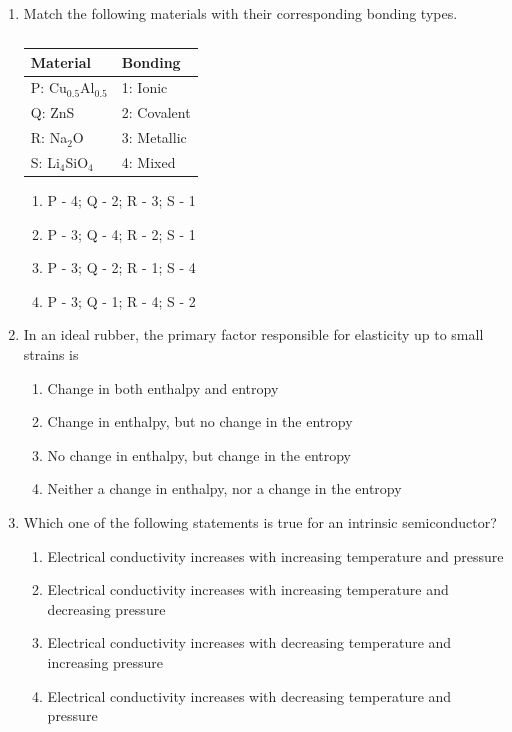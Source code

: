 \documentclass[a4paper,10pt]{article}
\begin{document}
\begin{enumerate}
\item Match the following materials with their corresponding bonding types.
\begin{table}[h]
    \centering
    \begin{tabular}{|l|l|}
    \hline
    \textbf{Material} & \textbf{Bonding} \\
    \hline
    P: Cu$_{0.5}$Al$_{0.5}$ & 1: Ionic \\
    Q: ZnS & 2: Covalent \\
    R: Na$_2$O & 3: Metallic \\
    S: Li$_4$SiO$_4$ & 4: Mixed \\
    \hline
    \end{tabular}
    \caption*{}
    \label{tab:q45}
\end{table}

\hfill{}
\begin{enumerate}
    \item P - 4; Q - 2; R - 3; S - 1
    \item P - 3; Q - 4; R - 2; S - 1
    \item P - 3; Q - 2; R - 1; S - 4
    \item P - 3; Q - 1; R - 4; S - 2
\end{enumerate}

\item In an ideal rubber, the primary factor responsible for elasticity up to small strains is

\hfill{}
\begin{enumerate}
    \item Change in both enthalpy and entropy
    \item Change in enthalpy, but no change in the entropy
    \item No change in enthalpy, but change in the entropy
    \item Neither a change in enthalpy, nor a change in the entropy
\end{enumerate}

\item Which one of the following statements is true for an intrinsic semiconductor?

\hfill{}
\begin{enumerate}
    \item Electrical conductivity increases with increasing temperature and pressure
    \item Electrical conductivity increases with increasing temperature and decreasing pressure
    \item Electrical conductivity increases with decreasing temperature and increasing pressure
    \item Electrical conductivity increases with decreasing temperature and pressure
\end{enumerate}


\end{enumerate}
\end{document}
